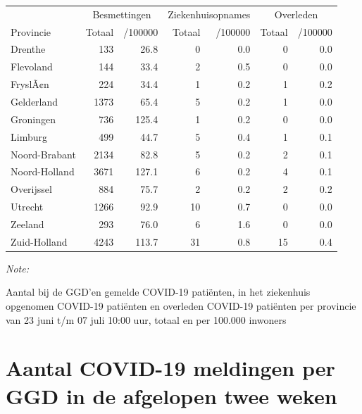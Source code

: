 \documentclass[
  english,
  man,floatsintext]{apa6}
\begin{document}
\begin{table}
\centering
\begin{threeparttable}
\begin{tabular}{lrrrrrr}
\toprule
\multicolumn{1}{c}{ } & \multicolumn{2}{c}{Besmettingen} & \multicolumn{2}{c}{Ziekenhuisopnames} & \multicolumn{2}{c}{Overleden} \\
\cmidrule(l{3pt}r{3pt}){2-3} \cmidrule(l{3pt}r{3pt}){4-5} \cmidrule(l{3pt}r{3pt}){6-7}
Provincie & Totaal & /100000 & Totaal & /100000 & Totaal & /100000\\
\midrule
Drenthe & 133 & 26.8 & 0 & 0.0 & 0 & 0.0\\
Flevoland & 144 & 33.4 & 2 & 0.5 & 0 & 0.0\\
FryslÃ¢n & 224 & 34.4 & 1 & 0.2 & 1 & 0.2\\
Gelderland & 1373 & 65.4 & 5 & 0.2 & 1 & 0.0\\
Groningen & 736 & 125.4 & 1 & 0.2 & 0 & 0.0\\
Limburg & 499 & 44.7 & 5 & 0.4 & 1 & 0.1\\
Noord-Brabant & 2134 & 82.8 & 5 & 0.2 & 2 & 0.1\\
Noord-Holland & 3671 & 127.1 & 6 & 0.2 & 4 & 0.1\\
Overijssel & 884 & 75.7 & 2 & 0.2 & 2 & 0.2\\
Utrecht & 1266 & 92.9 & 10 & 0.7 & 0 & 0.0\\
Zeeland & 293 & 76.0 & 6 & 1.6 & 0 & 0.0\\
Zuid-Holland & 4243 & 113.7 & 31 & 0.8 & 15 & 0.4\\
\bottomrule
\end{tabular}
\begin{tablenotes}
\item \textit{Note: } 
\item Aantal bij de GGD’en gemelde COVID-19 patiënten, in het ziekenhuis opgenomen COVID-19 patiënten en overleden COVID-19 patiënten per provincie van 23 juni t/m 07 juli 10:00 uur, totaal en per 100.000 inwoners
\end{tablenotes}
\end{threeparttable}
\end{table}

\newpage

\hypertarget{aantal-covid-19-meldingen-per-ggd-in-de-afgelopen-twee-weken}{%
\section{Aantal COVID-19 meldingen per GGD in de afgelopen twee weken}\label{aantal-covid-19-meldingen-per-ggd-in-de-afgelopen-twee-weken}}
\end{document}
